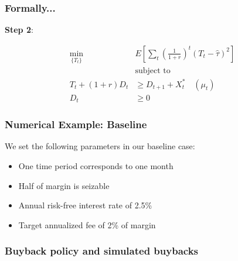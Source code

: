 \documentclass[10pt]{beamer}
\begin{document}
  \begin{frame} \frametitle{Formally...}

    \textbf{Step 2}:

    \begin{align*}
      \min_{\{T_t\}} \; & E \left[ \sum_{t} \left( \frac{1}{1 + r} \right)^t (T_t - \hat{\tau})^2 \right] \\
      &\text{subject to} \\
      T_t + (1 + r) D_t &\geq D_{t+1} + X^*_t \quad (\mu_t) \\
      D_t &\geq 0
    \end{align*}

  \end{frame}

  \begin{frame} \frametitle{Numerical Example: Baseline}

    We set the following parameters in our baseline case:

    \begin{itemize}
      \item One time period corresponds to one month
      \item Half of margin is seizable
      \item Annual risk-free interest rate of 2.5\%
      \item Target annualized fee of 2\% of margin
    \end{itemize}

  \end{frame}

  \begin{frame} \frametitle{Buyback policy and simulated buybacks}

    \begin{figure}
    \end{figure}

  \end{frame}
\end{document}
